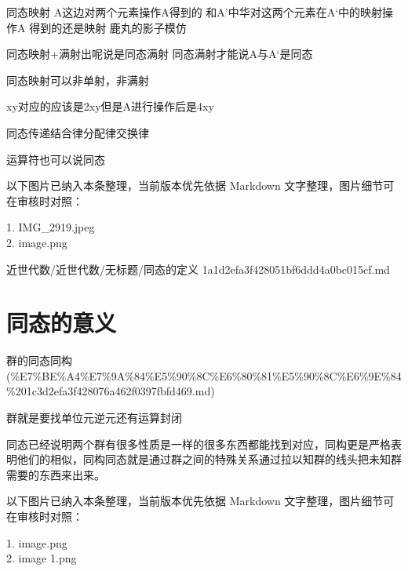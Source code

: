 \begin{definition}[同态的定义]

同态映射  A这边对两个元素操作A得到的 和A’中华对这两个元素在A‘中的映射操作A 得到的还是映射   鹿丸的影子模仿

同态映射+满射出呢说是同态满射 同态满射才能说A与A‘是同态

同态映射可以非单射，非满射

xy对应的应该是2xy但是A进行操作后是4xy

同态传递结合律分配律交换律

运算符也可以说同态

\end{definition}

\begin{note}[关联图片]
以下图片已纳入本条整理，当前版本优先依据 Markdown 文字整理，图片细节可在审核时对照：

1. IMG\_2919.jpeg\\
2. image.png\\

\end{note}

\begin{note}[来源路径]

近世代数/近世代数/无标题/同态的定义 1a1d2efa3f428051bf6ddd4a0bc015cf.md

\end{note}

\section*{同态的意义}

\begin{note}[来源上级主题]

群的同态同构 (\%E7\%BE\%A4\%E7\%9A\%84\%E5\%90\%8C\%E6\%80\%81\%E5\%90\%8C\%E6\%9E\%84\%201c3d2efa3f428076a462f0397fbfd469.md)

\end{note}

\begin{note}[同态的意义]

群就是要找单位元逆元还有运算封闭

同态已经说明两个群有很多性质是一样的很多东西都能找到对应，同构更是严格表明他们的相似，同构同态就是通过群之间的特殊关系通过拉以知群的线头把未知群需要的东西来出来。

\end{note}

\begin{note}[关联图片]
以下图片已纳入本条整理，当前版本优先依据 Markdown 文字整理，图片细节可在审核时对照：

1. image.png\\
2. image 1.png\\

\end{note}

